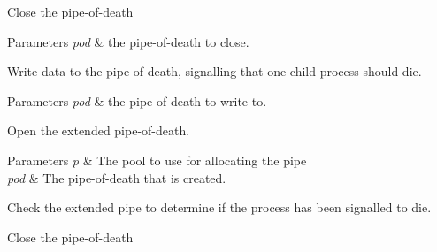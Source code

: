 Close the pipe-\/of-\/death


\begin{DoxyParams}{Parameters}
{\em pod} & the pipe-\/of-\/death to close.\\
\hline
\end{DoxyParams}
Write data to the pipe-\/of-\/death, signalling that one child process should die. 
\begin{DoxyParams}{Parameters}
{\em pod} & the pipe-\/of-\/death to write to.\\
\hline
\end{DoxyParams}
Open the extended pipe-\/of-\/death. 
\begin{DoxyParams}{Parameters}
{\em p} & The pool to use for allocating the pipe \\
\hline
{\em pod} & The pipe-\/of-\/death that is created.\\
\hline
\end{DoxyParams}
Check the extended pipe to determine if the process has been signalled to die.

Close the pipe-\/of-\/death


